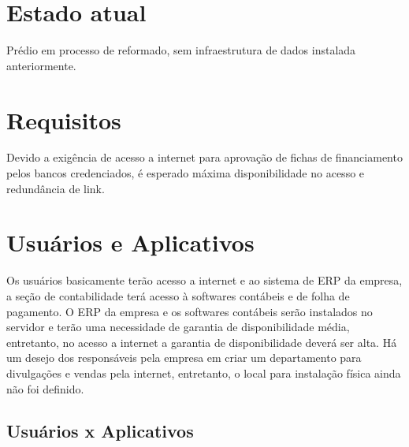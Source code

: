 \documentclass[	DIV=calc,%
							paper=a4,%
							fontsize=12pt,%
							onecolumn]{scrartcl}	 					%
\begin{document}
\section{Estado atual}
Prédio em processo de reformado, sem infraestrutura de dados instalada anteriormente.

\section{Requisitos}
Devido a exigência de acesso a internet para aprovação de fichas de financiamento pelos bancos credenciados, é esperado máxima disponibilidade no acesso e redundância de link. 

\section{Usuários e Aplicativos}
Os usuários basicamente terão acesso a internet e ao sistema de ERP da empresa, a seção de contabilidade terá acesso à softwares contábeis e de folha de pagamento. O ERP da empresa e os softwares contábeis serão instalados no servidor e terão uma necessidade de garantia de disponibilidade média, entretanto, no acesso a internet a garantia de disponibilidade deverá ser alta.  Há um desejo dos responsáveis pela empresa em criar um departamento para divulgações e vendas pela internet, entretanto, o local para instalação física ainda não foi definido.

\subsection{Usuários x Aplicativos}
\end{document}
